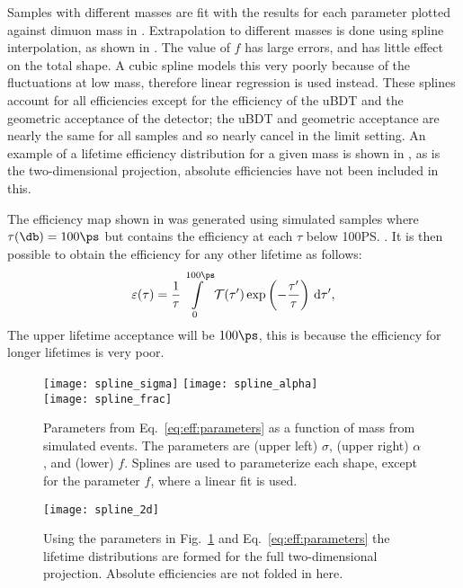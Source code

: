 Samples with different masses are fit with the results for each parameter plotted against dimuon
mass in .
Extrapolation to different masses is done using spline interpolation, as shown in
.
The value of $f$ has large errors, and has little effect on the total shape.
A cubic spline models this very poorly because of the fluctuations at low mass, therefore linear
regression is used instead.
These splines account for all efficiencies except for the efficiency of the uBDT and the geometric
acceptance of the \lhcb detector; the uBDT and geometric acceptance are nearly the same for all
samples and so nearly cancel in the limit setting.
An example of a lifetime efficiency distribution for a given mass is shown in ,
as is the two-dimensional projection, absolute efficiencies have not been included in this.

The efficiency map shown in  was generated using simulated samples where
$\tau(\db)=100\ps$ but contains the efficiency at each $\tau$ below 100\ps.
It is then possible to obtain the efficiency for any other lifetime as follows:
\begin{equation}
  \varepsilon(\tau) =
  \frac{1}{\tau}\int\limits_0^{100\ps}
  \mathcal{T}(\tau^{\prime})
  \exp\left(-\frac{\tau^{\prime}}{\tau}\right)
  \,{\rm d}\tau^{\prime},
\end{equation}
The upper lifetime acceptance will be $100\ps$, this is because the efficiency for longer lifetimes
is very poor.


\begin{figure}
  \begin{center}
    \texttt{[image: spline\_sigma]}
    \texttt{[image: spline\_alpha]}\\
    \texttt{[image: spline\_frac]}
    \caption{
      Parameters from Eq.~\protect\ref{eq:eff:parameters} as a function of mass from
      simulated events.
      The parameters are
      (upper left) $\sigma$,
      (upper right) $\alpha$, and
      (lower) $f$.
      Splines are used to parameterize each shape, except for the parameter $f$, where a
      linear fit is used.
    }
    \label{fig:eff:spline}
  \end{center}
\end{figure}

\begin{figure}
  \begin{center}
    \texttt{[image: spline\_2d]}
    \caption{
      Using the parameters in Fig.~\ref{fig:eff:spline} and Eq.~\protect\ref{eq:eff:parameters} the
      lifetime distributions are formed for the full two-dimensional projection.
      Absolute efficiencies are not folded in here.
    }
    \label{fig:eff:effmap}
  \end{center}
\end{figure}












